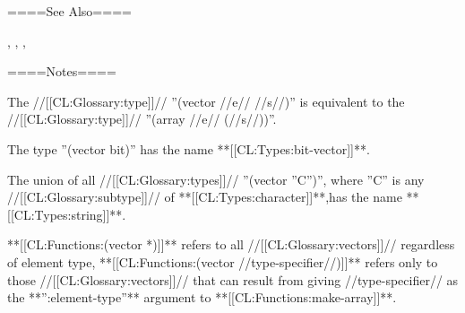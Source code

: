 ====See Also====

{\secref\RequiredSpecializedArrays}, {\secref\SharpsignLeftParen}, {\secref\PrintingOtherVectors}, {\secref\SharpsignA}

====Notes====

The //[[CL:Glossary:type]]// ''(vector //e// //s//)'' is equivalent to the //[[CL:Glossary:type]]// ''(array //e// (//s//))''.

The type ''(vector bit)'' has the name **[[CL:Types:bit-vector]]**.

The union of all //[[CL:Glossary:types]]// ''(vector ''C'')'', where ''C'' is any //[[CL:Glossary:subtype]]// of **[[CL:Types:character]]**,has the name **[[CL:Types:string]]**.

**[[CL:Functions:(vector *)]]** refers to all //[[CL:Glossary:vectors]]// regardless of element type, **[[CL:Functions:(vector //type-specifier//)]]** refers only to those //[[CL:Glossary:vectors]]// that can result from giving //type-specifier// as the **'':element-type''** argument to **[[CL:Functions:make-array]]**.

 
